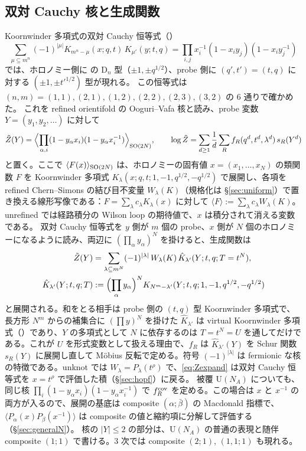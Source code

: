 \subsection{双対 Cauchy 核と生成関数}
Koornwinder 多項式の双対 Cauchy 恒等式（\cite{Mimachi01}）
\[
\sum_{\mu \subseteq m^n} (-1)^{|\mu|} K_{m^n - \mu}(x; q, t)\, K_{\mu'}(y; t, q) = \prod_{i, j} x_i^{-1}(1 - x_i y_j)(1 - x_i y_j^{-1})
\]
では、ホロノミー側に \cite{AgSc12} の D$_n$ 型（$\pm1, \pm q^{1/2}$）、probe 側に $(q', t') = (t, q)$ に対する $(\pm 1, \pm t'^{1/2})$ 型が現れる。
この恒等式は $(n, m) = (1,1), (2,1), (1,2), (2,2), (2,3), (3,2)$ の 6 通りで確かめた。
これを refined orientifold の Ooguri--Vafa 核と読み、probe 変数 $Y = (y_1, y_2, \dots)$ に対して
\begin{equation}\label{eq:Z}
\tilde Z(Y) = \Bigl\langle \prod_{\alpha, i} (1 - y_\alpha x_i)(1 - y_\alpha x_i^{-1}) \Bigr\rangle_{\mathrm{SO}(2N)},\qquad
\log \tilde Z = \sum_{d \ge 1} \frac1d \sum_R f_R(q^d, t^d, \lambda^d)\, s_R(Y^d)
\end{equation}
と置く。ここで $\langle F(x)\rangle_{\mathrm{SO}(2N)}$ は、ホロノミーの固有値 $x = (x_1, \dots, x_N)$ の類関数 $F$ を Koornwinder 多項式 $K_\lambda(x; q, t; 1, -1, q^{1/2}, -q^{1/2})$ で展開し、各項を refined Chern--Simons の結び目不変量 $W_\lambda(K)$（規格化は \S\ref{sec:uniform}）で置き換える線形写像である：$F = \sum_\lambda c_\lambda K_\lambda(x)$ に対して $\langle F\rangle := \sum_\lambda c_\lambda W_\lambda(K)$。unrefined では経路積分の Wilson loop の期待値で、$x$ は積分されて消える変数である。
双対 Cauchy 恒等式を $y$ 側が $m$ 個の probe、$x$ 側が $N$ 個のホロノミーになるように読み、両辺に $(\prod_\alpha y_\alpha)^N$ を掛けると、生成関数は
\begin{equation}\label{eq:Zexpand}
\begin{aligned}
\tilde Z(Y) &= \sum_{\lambda \subseteq m^N} (-1)^{|\lambda|}\, W_\lambda(K)\, \hat K_{\lambda'}(Y; t, q; T = t^N),\\
\hat K_{\lambda'}(Y; t, q; T) &:= \Bigl(\prod_\alpha y_\alpha\Bigr)^N K_{N^m - \lambda'}(Y; t, q; 1, -1, q^{1/2}, -q^{1/2})
\end{aligned}
\end{equation}
と展開される。和をとる相手は probe 側の $(t, q)$ 型 Koornwinder 多項式で、長方形 $N^m$ からの補集合に $(\prod y)^N$ を掛けた $\hat K_{\lambda'}$ は virtual Koornwinder 多項式（\cite{Rains05,RW21}）であり、$Y$ の多項式として $N$ に依存するのは $T = t^N = U$ を通してだけである。これが $U$ を形式変数として扱える理由で、$f_R$ は $\hat K_{\lambda'}(Y)$ を Schur 関数 $s_R(Y)$ に展開し直して Möbius 反転で定める。符号 $(-1)^{|\lambda|}$ は fermionic な核の特徴である。unknot では $W_\lambda = P_\lambda(t^\rho)$ で、\eqref{eq:Zexpand} は双対 Cauchy 恒等式を $x = t^\rho$ で評価した積（\S\ref{sec:hopf}）に戻る。
被覆 U$(N_A)$ についても、同じ核 $\prod_i(1 - y_\alpha x_i)(1 - y_\alpha x_i^{-1})$ で $f^{\mathrm{cov}}_R$ を定める。この場合は $x$ と $x^{-1}$ の両方が入るので、展開の基底は composite $(\alpha; \bar\beta)$ の Macdonald 指標で、$\langle P_\alpha(x) P_\beta(x^{-1})\rangle$ は composite の値と縮約項に分解して評価する（\S\ref{sec:generalN}）。
核の $|Y| \le 2$ の部分は、U$(N_A)$ の普通の表現と随伴 composite $(1;1)$ で書ける。3 次では composite $(2;1)$, $(1,1;1)$ も現れる。

